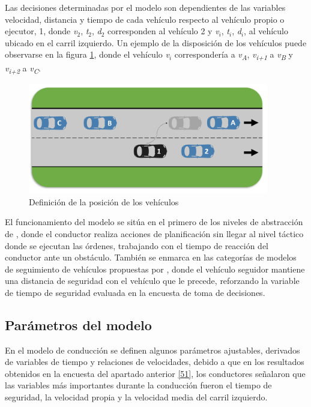 Las decisiones determinadas por el modelo son dependientes de las variables velocidad, distancia y tiempo de cada vehículo respecto al vehículo propio o ejecutor, 1, donde \emph{v$_2$}, \emph{t$_2$}, \emph{d$_2$} corresponden al vehículo 2 y \emph{v$_i$}, \emph{t$_i$}, \emph{d$_i$}, al vehículo ubicado en el carril izquierdo. Un ejemplo de la disposición de los vehículos puede observarse en la figura \ref{fig:5.1}, donde el vehículo \emph{v$_i$} correspondería a \emph{v\textsubscript{A}}, \emph{v\textsubscript{i+1}} a \emph{v\textsubscript{B}} y \emph{v\textsubscript{i+2}} a \emph{v\textsubscript{C}}.

\begin{figure}[h]
    \centering
    \includegraphics[width=10.5cm]
    {figures/5.1.png}
    \caption{ \label{fig:5.1} Definición de la posición de los vehículos}
\end{figure}

El funcionamiento del modelo se sitúa en el primero de los niveles de abstracción de \textcite{michon}, donde el conductor realiza acciones de planificación sin llegar al nivel táctico donde se ejecutan las órdenes, trabajando con el tiempo de reacción del conductor ante un obstáculo. También se enmarca en las categorías de modelos de seguimiento de vehículos propuestas por \textcite{olstam}, donde el vehículo seguidor mantiene una distancia de seguridad con el vehículo que le precede, reforzando la variable de tiempo de seguridad evaluada en la encuesta de toma de decisiones.

\subsection{Parámetros del modelo}\label{521}
En el modelo de conducción se definen algunos parámetros ajustables, derivados de variables de tiempo y relaciones de velocidades, debido a que en los resultados obtenidos en la encuesta del apartado anterior \ref{51}, los conductores señalaron que las variables más importantes durante la conducción fueron el tiempo de seguridad, la velocidad propia y la velocidad media del carril izquierdo.  

